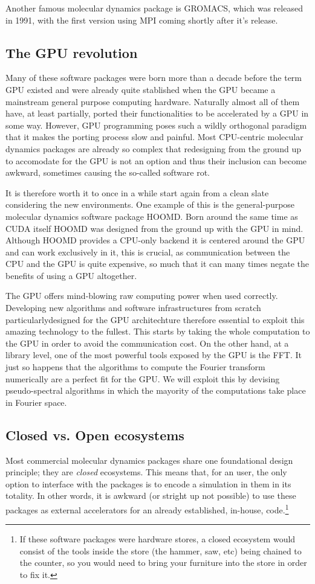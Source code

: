 \documentclass[ twoside,openright,titlepage,numbers=noenddot,%
headinclude,footinclude,cleardoublepage=empty,abstract=on,
BCOR=5mm,paper=a4,fontsize=11pt, dvipsnames
]{scrreprt}
\newcommand{\gpu}{\gls{GPU}\xspace}
\begin{document}
Another famous molecular dynamics package is GROMACS, which was released in 1991, with the first version using MPI coming shortly after it's release.

\subsection*{The GPU revolution}
Many of these software packages were born more than a decade before the term \gpu existed and were already quite stablished when the \gpu became a mainstream general purpose computing hardware. Naturally almost all of them have, at least partially, ported their functionalities to be accelerated by a \gpu in some way. However, \gpu programming poses such a wildly orthogonal paradigm that it makes the porting process slow and painful. Most CPU-centric molecular dynamics packages are already so complex that redesigning from the ground up to accomodate for the \gpu is not an option and thus their inclusion can become awkward, sometimes causing the so-called software rot.

It is therefore worth it to once in a while start again from a clean slate considering the new environments. One example of this is the general-purpose molecular dynamics software package HOOMD\cite{Anderson2008}. Born around the same time as CUDA itself HOOMD was designed from the ground up with the \gpu in mind. Although HOOMD provides a CPU-only backend it is centered around the \gpu and can work exclusively in it, this is crucial, as communication between the CPU and the \gpu is quite expensive, so much that it can many times negate the benefits of using a \gpu altogether.

The \gpu offers mind-blowing raw computing power when used correctly. Developing new algorithms and software infrastructures from scratch particularlydesigned for the \gpu architechture therefore essential to exploit this amazing technology to the fullest. This starts by taking the whole computation to the \gpu in order to avoid the communication cost. On the other hand, at a library level, one of the most powerful tools exposed by the \gpu is the \gls{FFT}. It just so happens that the algorithms to compute the Fourier transform numerically are a perfect fit for the \gpu. We will exploit this by devising pseudo-spectral algorithms in which the mayority of the computations take place in Fourier space.

\subsection*{Closed vs. Open ecosystems}
Most commercial molecular dynamics packages share one foundational design principle; they are \emph{closed} ecosystems. This means that, for an user, the only option to interface with the packages is to encode a simulation in them in its totality. In other words, it is awkward (or stright up not possible) to use these packages as external accelerators for an already established, in-house, code.\footnote{If these software packages were hardware stores, a closed ecosystem would consist of the tools inside the store (the hammer, saw, etc) being chained to the counter, so you would need to bring your furniture into the store in order to fix it.}  
\end{document}

